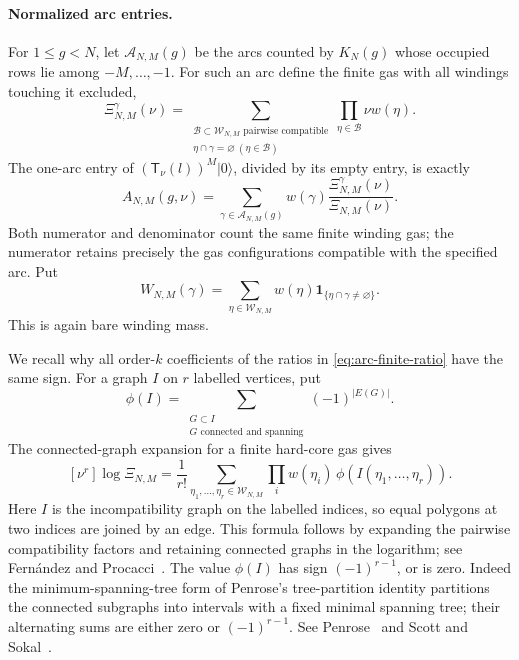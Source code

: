\paragraph{Normalized arc entries.}
For $1\le g<N$, let $\mathscr A_{N,M}(g)$ be the arcs counted by $K_N(g)$
whose occupied rows lie among $-M,\ldots,-1$. For such an arc define the
finite gas with all windings touching it excluded,
\[
 \Xi_{N,M}^{\gamma}(\nu)=
 \sum_{\substack{\mathcal B\subset\mathscr W_{N,M}\text{ pairwise compatible}\\
                  \eta\cap\gamma=\varnothing\ (\eta\in\mathcal B)}}
       \prod_{\eta\in\mathcal B}\nu w(\eta).
\]
The one-arc entry of $(\mathsf T_\nu(l))^M|0\rangle$, divided by its empty entry,
is exactly
\begin{equation}\label{eq:arc-finite-ratio}
 A_{N,M}(g,\nu)=\sum_{\gamma\in\mathscr A_{N,M}(g)}
       w(\gamma)\frac{\Xi_{N,M}^{\gamma}(\nu)}{\Xi_{N,M}(\nu)}.
\end{equation}
Both numerator and denominator count the same finite winding gas; the
numerator retains precisely the gas configurations compatible with the
specified arc. Put
\[
 W_{N,M}(\gamma)=\sum_{\eta\in\mathscr W_{N,M}}
       w(\eta)\mathbf1_{\{\eta\cap\gamma\ne\varnothing\}}.
\]
This is again bare winding mass.

We recall why all order-$k$ coefficients of the ratios in
\eqref{eq:arc-finite-ratio} have the same sign. For a graph $I$ on $r$
labelled vertices, put
\[
 \phi(I)=\sum_{\substack{G\subset I\\G\text{ connected and spanning}}}
             (-1)^{|E(G)|}.
\]
The connected-graph expansion for a finite hard-core gas gives
\[
 [\nu^r]\log\Xi_{N,M}
 =\frac1{r!}\sum_{\eta_1,\ldots,\eta_r\in\mathscr W_{N,M}}
      \prod_i w(\eta_i)\,\phi(I(\eta_1,\ldots,\eta_r)).
\]
Here $I$ is the incompatibility graph on the labelled indices, so equal
polygons at two indices are joined by an edge. This formula follows by
expanding the pairwise compatibility factors and retaining connected
graphs in the logarithm; see Fern\'andez and Procacci~\cite[Equations~(2.3)--(2.4)]{FernandezProcacci2007}. The value $\phi(I)$ has sign
$(-1)^{r-1}$, or is zero. Indeed the minimum-spanning-tree form of
Penrose's tree-partition identity partitions the connected subgraphs
into intervals with a fixed minimal spanning tree; their alternating
sums are either zero or $(-1)^{r-1}$. See Penrose~\cite{Penrose1967} and
Scott and Sokal~\cite[Lemma~2.2 and Proposition~2.3]{ScottSokal2005}.

